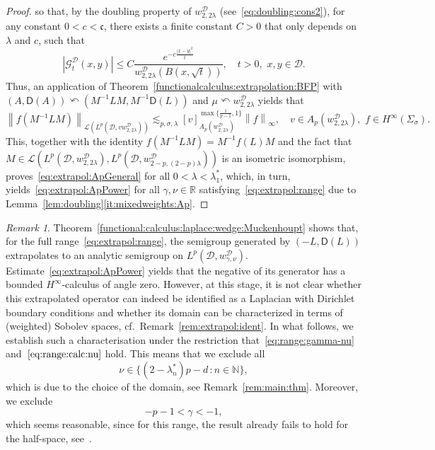 \documentclass[12pt,a4paper, reqno]{amsart}
\theoremstyle{plain}
\theoremstyle{definition}
\theoremstyle{remark}
\newtheorem{remark}[theorem]{Remark}
\numberwithin{equation}{section}
\newcommand{\1}{\mathbbm{1}}
\newcommand{\R}{\ensuremath{\mathbb{R}}}
\newcommand{\N}{\ensuremath{\mathbb{N}}}
\newcommand{\calG}{\ensuremath{\mathcal{G}}}
\newcommand{\calD}{\ensuremath{\mathcal{D}}}
\newcommand{\sL}{\ensuremath{\mathscr{L}}}
\newcommand{\sfD}{\ensuremath{\mathsf{D}}}
\newcommand{\scrL}{\ensuremath{\mathscr{L}}}
\newcommand{\nrm}[1]{\left\lVert #1 \right\rVert}
\begin{document}
\begin{proof}
so that, by the doubling property of $w^\calD_{2,2\lambda}$ (see~\eqref{eq:doubling:cons2}), for any constant $0<c<\mathfrak{c}$, there exists a finite constant $C>0$ that only depends on $\lambda$ and $c$, such that
\[
|\calG_t^\calD(x,y)|
\le 
C \frac{e^{-c\frac{|x-y|^2}{t}}}{w_{2,2\lambda}^\calD(B(x,\sqrt{t}))},\quad t>0,\,\,x,y\in\calD.
\]
Thus, an application of Theorem~\ref{functionalcalculus:extrapolation:BFP} with $(A,\sfD(A))\curvearrowleft (M^{-1}LM,M^{-1}\sfD(L))$ and $\mu\curvearrowleft w^\calD_{2,2\lambda}$
yields that
\[ 
\nrm{f(M^{-1}LM)}_{\scrL(L^p(\calD,v w_{2,2\lambda}^\calD))}
\lesssim_{p,\sigma,\lambda} 
[v]_{A_p(w_{2,2\lambda}^\calD)}^{\max\{\frac{1}{p-1},1\}}\nrm{f}_\infty,\quad v\in A_p(w_{2,2\lambda}^\calD),\,\, f\in H^\infty(\Sigma_\sigma).
\]
This, together with the identity $f(M^{-1}LM)=M^{-1}f(L)M$ and the fact that $M \in \sL(L^p(\calD, w^\calD_{2,2\lambda}),L^p(\calD,w^\calD_{2-p,(2-p)\lambda}))$ is an isometric isomorphism, proves~\eqref{eq:extrapol:ApGeneral} for all $0<\lambda<\lambda_1^*$, which, in turn, yields~\eqref{eq:extrapol:ApPower} for all $\gamma,\nu\in\R$ satisfying~\eqref{eq:extrapol:range} due to Lemma~\ref{lem:doubling}\ref{it:mixedweights:Ap}. 
\end{proof}

\begin{remark}
    Theorem~\ref{functional:calculus:laplace:wedge:Muckenhoupt} shows that, for the full range~\eqref{eq:extrapol:range},
    the semigroup generated by $(-L,\sfD(L))$ extrapolates to an analytic semigroup on $L^p(\calD,w_{\gamma,\nu}^\calD)$.
    Estimate~\eqref{eq:extrapol:ApPower} yields that the negative of its generator has a bounded $H^\infty$-calculus of angle zero.
    However, at this stage, it is not clear whether this extrapolated operator can indeed be identified as a Laplacian with Dirichlet boundary conditions and whether its domain can be characterized in terms of (weighted) Sobolev spaces, cf.~Remark~\ref{rem:extrapol:ident}.
    In what follows, we establish such a characterisation under the restriction that~\eqref{eq:range:gamma-nu} and~$\eqref{eq:range:calc:nu}$ hold.
    This means that we exclude all
    \[
    \nu
    \in
    \{(2-\lambda_n^*)p-d\,\colon n\in\N  \},
    \]
    which is due to the 
     choice of the domain,
    see Remark~\ref{rem:main:thm}. Moreover, we  exclude
    \[
    -p-1<\gamma< -1, 
    \]
    which seems reasonable, since for this range, the result already fails to hold for the half-space, see~\cite[Proposition~5.16]{LindemulderVeraar2020}.
\end{remark}
\end{document}
